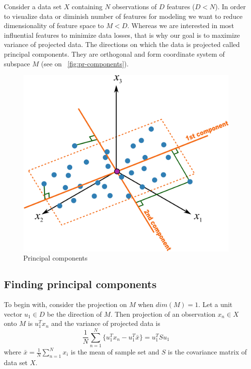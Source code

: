 Consider a data set $X$ containing $N$ observations of $D$ features ($D<N$). In order to visualize data or diminish number of features for modeling we want to reduce dimensionality of feature space to $M<D$. Whereas we are interested in most influential features to minimize data losses, that is why our goal is to maximize variance of projected data. The directions on which the data is projected called principal components. They are orthogonal and form coordinate system of subspace $M$ (see on ~\autoref{fig:pr-components}).

\begin{figure}
	\centering
	\includegraphics[scale=0.3]{img/geometric-PCA-8-both-components-with-plane.png}
	\caption{\label{fig:pr-components}Principal components}
\end{figure}

\subsection{Finding principal components}
To begin with, consider the projection on $M$ when $dim(M)=1$. Let a unit vector $u_1 \in D$ be the direction of $M$. Then projection of an observation $x_n\in X$ onto $M$ is $u_1^Tx_n$ and the variance of projected data is
\begin{equation}\label{var_proj}
 \dfrac{1}{N}\sum_{n=1}^{N}{\{u_1^T x_n - u_1^T \bar{x}\}}=u_1^T S u_1
\end{equation}	 
where $\bar{x} = \frac{1}{N}\sum_{n=1}^{N} x_i$ is the mean of sample set and $S$ is the covariance matrix of data set $X$.

